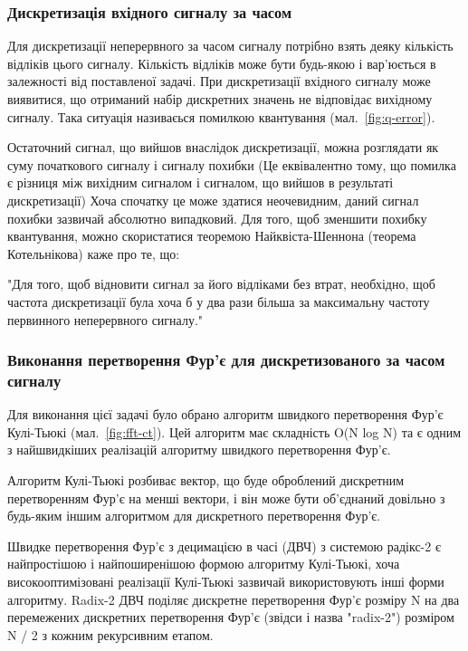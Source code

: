\subsubsection{Дискретизація вхідного сигналу за часом}


Для дискретизації неперервного за часом сигналу потрібно взять деяку кількість відліків цього сигналу. Кількість відліків може бути будь-якою і вар'юється в залежності від поставленої задачі. При дискретизації вхідного сигналу може виявитися, що отриманий набір дискретних значень не відповідає вихідному сигналу. Така ситуація називаєься помилкою квантування (мал.~\ref{fig:q-error}). 

Остаточний сигнал, що вийшов внаслідок дискретизації, можна розглядати як суму початкового сигналу і сигналу похибки (Це еквівалентно тому, що помилка є різниця між вихідним сигналом і сигналом, що вийшов в результаті дискретизації) Хоча спочатку це може здатися неочевидним, даний сигнал похибки зазвичай абсолютно випадковий. Для того, щоб зменшити похибку квантування, можно скористатися теоремою Найквіста-Шеннона (теорема Котельнікова) каже про те, що:

"Для того, щоб відновити сигнал за його відліками без втрат, необхідно, щоб частота дискретизації була хоча б у два рази більша за максимальну частоту первинного неперервного сигналу." \cite{shannon1949communities}

\subsubsection{Виконання перетворення Фур'є для дискретизованого за часом сигналу}


Для виконання цієї задачі було обрано алгоритм швидкого перетворення Фур'є Кулі-Тьюкі (мал.~\ref{fig:fft-ct}). Цей алгоритм має складність O(N log N) та є одним з найшвидкіших реалізацій алгоритму швидкого перетворення Фур'є.

Алгоритм Кулі-Тьюкі розбиває вектор, що буде оброблений дискретним перетворенням Фур'є на менші вектори, і він може бути об'єднаний довільно з будь-яким іншим алгоритмом для дискретного перетворення Фур'є. 

Швидке перетворення Фур'є з децимацією в часі (ДВЧ) з системою радікс-2 є найпростішою і найпоширенішою формою алгоритму Кулі-Тьюкі, хоча високооптимізовані реалізації Кулі-Тьюкі зазвичай використовують інші форми алгоритму.
Radix-2 ДВЧ поділяє дискретне перетворення Фур'є розміру N на два перемежених дискретних перетворення Фур'є (звідси і назва "radix-2") розміром N / 2 з кожним рекурсивним етапом.

